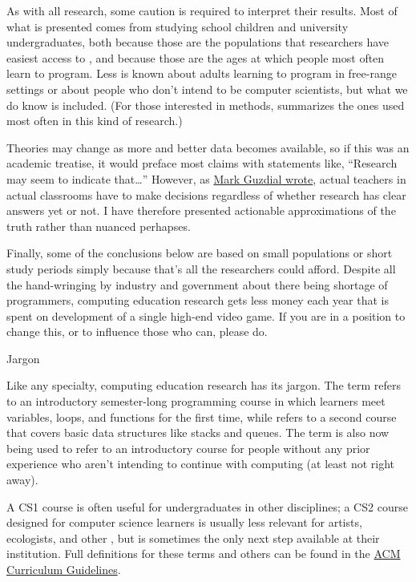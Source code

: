 As with all research, some caution is required to interpret their
results.  Most of what is presented comes from studying school
children and university undergraduates, both because those are the
populations that researchers have easiest access to \cite{Henr2010},
and because those are the ages at which people most often learn to
program.  Less is known about adults learning to program in free-range
settings or about people who don't intend to be computer scientists,
but what we do know is included.  (For those interested in methods,
\cite{Ihan2016} summarizes the ones used most often in this kind of
research.)

Theories may change as more and better data becomes available, so if
this was an academic treatise, it would preface most claims with
statements like, ``Research may seem to indicate that{\ldots}''
However, as
\href{https://computinged.wordpress.com/2018/06/15/are-you-talking-to-me-interaction-between-teachers-and-researchers-around-evidence-truth-and-decision-making/}{Mark
  Guzdial wrote}, actual teachers in actual classrooms have to make
decisions regardless of whether research has clear answers yet or not.
I have therefore presented actionable approximations of the truth
rather than nuanced perhapses.

Finally, some of the conclusions below are based on small populations
or short study periods simply because that's all the researchers could
afford.  Despite all the hand-wringing by industry and government
about there being shortage of programmers, computing education
research gets less money each year that is spent on development of a
single high-end video game.  If you are in a position to change this,
or to influence those who can, please do.

\begin{callout}{Jargon}

  Like any specialty, computing education research has its jargon.
  The term  refers to an introductory
  semester-long programming course in which learners meet variables,
  loops, and functions for the first time, while 
  refers to a second course that covers basic data structures like
  stacks and queues.  The term  is also now being
  used to refer to an introductory course for people without any prior
  experience who aren't intending to continue with computing (at least
  not right away).

  A CS1 course is often useful for undergraduates in other
  disciplines; a CS2 course designed for computer science learners is
  usually less relevant for artists, ecologists, and other
  , but is
  sometimes the only next step available at their institution.  Full
  definitions for these terms and others can be found in the
  \href{https://www.acm.org/education/curricula-recommendations}{ACM
    Curriculum Guidelines}.

\end{callout}


